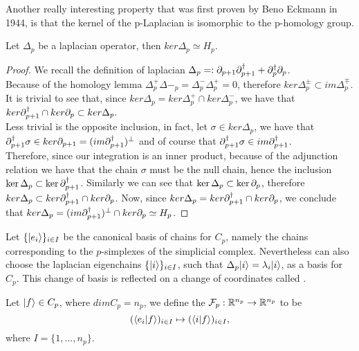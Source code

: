 \documentclass[../1.tex]{subfiles}
\begin{document}
    Another really interesting property that was first proven by Beno Eckmann in 1944, is that the kernel of the p-Laplacian
    is isomorphic to the p-homology group.

    \begin{thm}
        Let $\Delta_p$ be a laplacian operator, then $ker\Delta_p \simeq H_p$.
    \end{thm}
    \begin{proof}
        We recall the definition of laplacian $\Delta_p =: \partial_{p+1}\partial^\dagger_{p+1} + \partial^\dagger_p\partial_p$.\\
        Because of the homology lemma $\Delta^+_p\Delta-_p = \Delta^-_p\Delta^+_p = 0$, therefore $ker\Delta^{\pm}_p \subset im\Delta^{\mp}_p.$\\
        It is trivial to see that, since $ker\Delta_p = ker\Delta^+_p \cap ker\Delta^-_p $, we have that $ker\partial^\dagger_{p+1} \cap ker\partial_p \subset ker\Delta_p.$ \\
        Less trivial is the opposite inclusion, in fact, let $\sigma \in ker\Delta_p$, we have that $\partial_{p+1}^\dagger\sigma \in ker\partial_{p+1} = (im\partial_{p+1}^\dagger)^\perp$ 
        and of course that $\partial_{p+1}^\dagger\sigma \in im\partial_{p+1}^\dagger$.\\
         Therefore, since our integration is an inner product, because of the adjunction relation we have that the chain $\sigma$ must
        be the null chain, hence the inclusion $\ker\Delta_p \subset \ker\partial_{p+1}^\dagger$. Similarly we can see that $\ker\Delta_p \subset \ker\partial_p$,        
        therefore $ker\Delta_p \subset ker\partial^\dagger_{p+1} \cap ker\partial_p $. Now, since $ker\Delta_p = ker\partial^\dagger_{p+1} \cap ker\partial_p$, we conclude that 
        $ker\Delta_p = (im\partial_{p+1}^\dagger)^\perp \cap ker\partial_p \simeq H_p$. \qedhere
    \end{proof}

    Let $\{| e_i \rangle\}_{i \in I}$ be the canonical basis of chains for $C_p$, namely the chains corresponding to the $p$-simplexes of the simplicial complex.
    Nevertheless can also choose the laplacian eigenchains $\{| i \rangle\}_{i \in I}$, such that $\Delta_p| i \rangle = \lambda_i| i \rangle$, as a basis for $C_p$. This change of basis
    is reflected on a change of coordinates called .

    \begin{defn}
        Let $| f \rangle \in C_p$, where $dimC_p = n_p$, we define the  $\mathcal{F}_p : \mathbb{R}^{n_p} \to \mathbb{R}^{n_p}$ to be
        \[ (\langle e_i | f \rangle)_{i \in I} \mapsto (\langle i | f \rangle)_{i \in I},\]
        where $I = \{1,...,n_p\}$.
    \end{defn}
\end{document}
